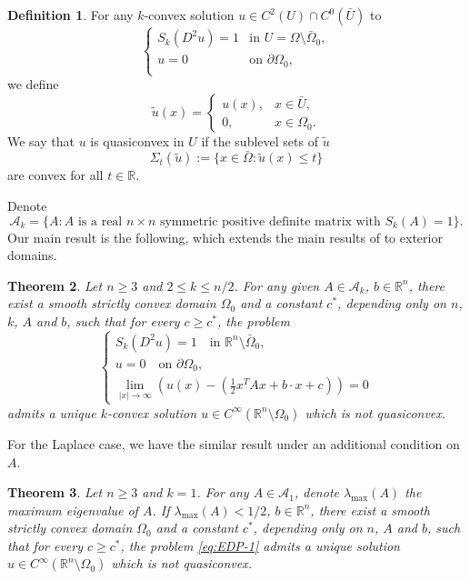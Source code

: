 \documentclass[reqno]{amsart}
\newtheorem{theorem}{Theorem}[section]
\theoremstyle{remark}
\theoremstyle{definition}
\newtheorem{definition}[theorem]{Definition}
\numberwithin{equation}{section}
\begin{document}
\begin{definition}
	For any $k$-convex solution $u\in C^2(U)\cap C^0(\bar{U})$ to \begin{equation*}
	\begin{cases}
		S_k(D^2u)=1 & \text{in }U=\Omega\setminus\bar{\Omega}_0, \\
		u=0 & \text{on }\partial\Omega_0, \\
	\end{cases}
\end{equation*} 
we define
	\begin{equation*}
		\tilde{u}(x)=
		\begin{cases} 
			u(x), & x\in\bar{U}, \\
			0, & x\in \Omega_0.
		\end{cases}
	\end{equation*} 
	We say that $u$ is quasiconvex in $U$ if the sublevel sets of $\tilde{u}$
	$$\Sigma_t(\tilde{u}):=\{x\in\bar{\Omega}: \tilde{u}(x)\leq t\}$$
	are convex for all $t\in\mathbb{R}$.
\end{definition}

Denote 
$$\mathcal{A}_k=\{A: A \text{ is a real }n\times n \text{ symmetric positive definite matrix with }S_k(A)=1\}.$$  
Our main result is the following, which extends the main results of \cite{Wang-Xiao} to exterior domains.
\begin{theorem}\label{thm:main}
	Let $n\geq3$  and $2\leq k \le n/2$. 
	For any given $A\in\mathcal{A}_k$, $b\in\mathbb{R}^n$, 
	there exist a smooth strictly convex domain $\Omega_0$ and a constant $c^*$, 
	depending only on $n$, $k$, $A$ and $b$, 
	such that for every $c\geq c^*$, the problem
	\begin{equation}\label{eq:EDP-1}
		\begin{cases}
			S_k(D^2u)=1 \quad \text{in }\mathbb{R}^n\setminus\bar\Omega_0, \\
			u=0 \quad \text{on }\partial\Omega_0, \\
			\lim\limits_{|x|\to\infty}\left(u(x)-\left(\frac{1}{2}x^TAx+b\cdot x+c\right)\right)=0
	    \end{cases}
	\end{equation}
	admits a unique $k$-convex solution $u\in C^\infty(\mathbb{R}^n\setminus\Omega_0)$ which is not quasiconvex.
\end{theorem}  

For the Laplace case, we have the similar result under an additional condition on  $A$.

\begin{theorem}\label{thm:main-1}
	Let $n\geq3$ and $k=1$. For any $A\in\mathcal{A}_1$, denote $\lambda_{\max}(A)$ the maximum eigenvalue of $A$. If $\lambda_{\max}(A)<1/2$, $b\in\mathbb{R}^n$, 
	there exist a smooth strictly convex domain $\Omega_0$ and a constant $c^*$, 
	depending only on $n$, $A$ and $b$, 
	such that for every $c\geq c^*$, the problem \eqref{eq:EDP-1} admits a unique solution $u\in C^\infty(\mathbb{R}^n\setminus\Omega_0)$ which is not quasiconvex.
\end{theorem}
\end{document}
